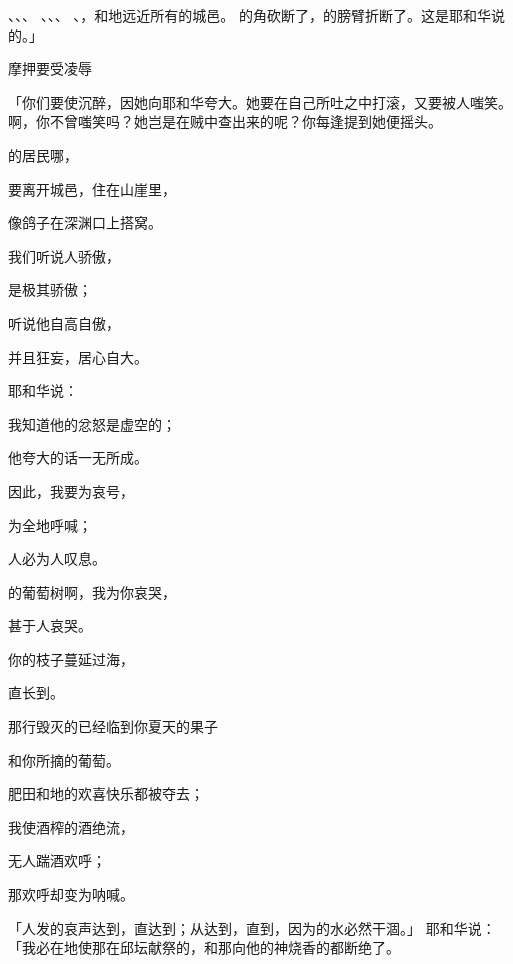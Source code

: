 {、{}、{}、
、{}、{}、
、{}，和{}地远近所有的城邑。
的角砍断了，{}的膀臂折断了。这是耶和华说的。」
\par }{\SH 摩押要受凌辱
\par }{\PP {}「你们要使{}沉醉，因她向耶和华夸大。她要在自己所吐之中打滚，又要被人嗤笑。
啊，你不曾嗤笑{}吗？她岂是在贼中查出来的呢？你每逢提到她便摇头。
\par }{\Q {}的居民哪，
\par }{\Q 要离开城邑，住在山崖里，
\par }{\Q 像鸽子在深渊口上搭窝。
\par }{\Q {}我们听说{}人骄傲，
\par }{\Q 是极其骄傲；
\par }{\Q 听说他自高自傲，
\par }{\Q 并且狂妄，居心自大。
\par }{\Q {}耶和华说：
\par }{\Q 我知道他的忿怒是虚空的；
\par }{\Q 他夸大的话一无所成。
\par }{\Q {}因此，我要为{}哀号，
\par }{\Q 为{}全地呼喊；
\par }{\Q 人必为{}人叹息。
\par }{\Q {}的葡萄树啊，我为你哀哭，
\par }{\Q 甚于{}人哀哭。
\par }{\Q 你的枝子蔓延过海，
\par }{\Q 直长到{}。
\par }{\Q 那行毁灭的已经临到你夏天的果子
\par }{\Q 和你所摘的葡萄。
\par }{\Q {}肥田和{}地的欢喜快乐都被夺去；
\par }{\Q 我使酒榨的酒绝流，
\par }{\Q 无人踹酒欢呼；
\par }{\Q 那欢呼却变为{}呐喊。
\par }{\PP {}「{}人发的哀声达到{}，直达到{}；从{}达到{}，直到{}，因为{}的水必然干涸。」
耶和华说：「我必在{}地使那在邱坛献祭的，和那向他的神烧香的都断绝了。
}
